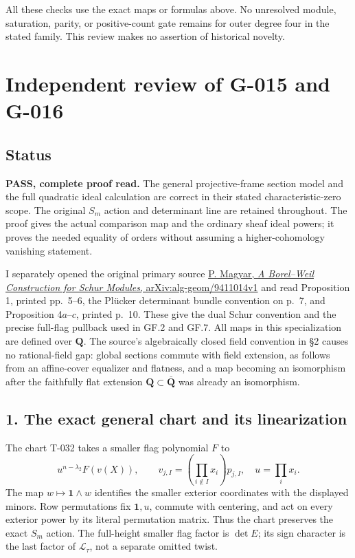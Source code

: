 \documentclass[
  10pt,
]{article}
\begin{document}
All these checks use the exact maps or formulas above. No unresolved
module, saturation, parity, or positive-count gate remains for outer
degree four in the stated family. This review makes no assertion of
historical novelty.

\section{Independent review of G-015 and
G-016}\label{independent-review-of-g-015-and-g-016}

\subsection{Status}\label{status}

\textbf{PASS, complete proof read.} The general projective-frame section
model and the full quadratic ideal calculation are correct in their
stated characteristic-zero scope. The original \(S_m\) action and
determinant line are retained throughout. The proof gives the actual
comparison map and the ordinary sheaf ideal powers; it proves the needed
equality of orders without assuming a higher-cohomology vanishing
statement.

I separately opened the original primary source
\href{https://arxiv.org/pdf/alg-geom/9411014}{P. Magyar, \emph{A
Borel--Weil Construction for Schur Modules}, arXiv:alg-geom/9411014v1}
and read Proposition 1, printed pp.~5--6, the Plücker determinant bundle
convention on p.~7, and Proposition 4\(a\)--\(c\), printed p.~10. These
give the dual Schur convention and the precise full-flag pullback used
in GF.2 and GF.7. All maps in this specialization are defined over
\(\mathbf Q\). The source's algebraically closed field convention in §2
causes no rational-field gap: global sections commute with field
extension, as follows from an affine-cover equalizer and flatness, and a
map becoming an isomorphism after the faithfully flat extension
\(\mathbf Q\subset\overline{\mathbf Q}\) was already an isomorphism.

\subsection{1. The exact general chart and its
linearization}\label{the-exact-general-chart-and-its-linearization}

The chart T-032 takes a smaller flag polynomial \(F\) to \[
u^{n-\lambda_2}F(v(X)),\qquad
v_{j,I}=\left(\prod_{i\notin I}x_i\right)p_{j,I},
\quad u=\prod_i x_i.
\] The map \(w\mapsto\mathbf1\wedge w\) identifies the smaller exterior
coordinates with the displayed minors. Row permutations fix
\(\mathbf1,u\), commute with centering, and act on every exterior power
by its literal permutation matrix. Thus the chart preserves the exact
\(S_m\) action. The full-height smaller flag factor is \(\det E\); its
sign character is the last factor of \(\mathcal L_\tau\), not a separate
omitted twist.
\end{document}
